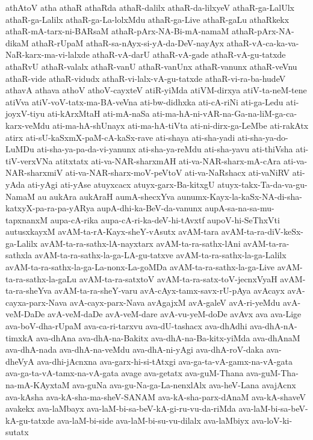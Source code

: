 {athAtoV
atha
athaR
athaRda
athaR-dalilx
athaR-da-lilxyeV
athaR-ga-LalUlx
athaR-ga-Lalilx
athaR-ga-La-lolxMdu
athaR-ga-Live
athaR-gaLu
athaRkekx
athaR-mA-tarx-ni-BARsaM
athaR-pArx-NA-Bi-mA-namaM
athaR-pArx-NA-dikaM
athaR-rUpaM
athaR-sa-nAyx-si-yA-da-DeV-nayAyx
athaR-vA-ca-ka-va-NaR-karx-ma-vi-lalxde
athaR-vA-darU
athaR-vA-gade
athaR-vA-gu-tatxde
athaRvU
athaR-valalx
athaR-vanU
athaR-vanUnx
athaR-vanunx
athaR-veVnu
athaR-vide
athaR-vidudx
athaR-vi-lalx-vA-gu-tatxde
athaR-vi-ra-ba-hudeV
athavA
athava
athoV
athoV-cayxteV
atiR-yiMda
atiVM-dirxya
atiV-ta-neM-tene
atiVva
atiV-voV-tatx-ma-BA-veVna
ati-bw-didhxka
ati-cA-riNi
ati-ga-Ledu
ati-joyxV-tiyu
ati-kArxMtaH
ati-mA-naSa
ati-ma-hA-ni-vAR-na-Ga-na-liM-ga-ca-karx-veMdu
ati-ma-hA-shUnayx
ati-ma-hA-tiVta
ati-ni-dirx-ga-LeMbe
ati-rakAtx
atirx
ati-sU-kaSxmX-paM-cA-kaSx-rave
ati-shaya
ati-sha-yadi
ati-sha-ya-do-LuMDu
ati-sha-ya-pa-da-vi-yanunx
ati-sha-ya-reMdu
ati-sha-yavu
ati-thiVsha
ati-tiV-verxVNa
atitxtatx
ati-va-NAR-sharxmAH
ati-va-NAR-sharx-mA-cAra
ati-va-NAR-sharxmiV
ati-va-NAR-sharx-moV-peVtoV
ati-va-NaRshacx
ati-vaNiRV
ati-yAda
ati-yAgi
ati-yAse
atuyxcacx
atuyx-garx-Ba-kitxgU
atuyx-takx-Ta-da-va-gu-NamaM
au
aukAra
aukAraH
aumA-shecxYva
aunumx-Kayx-la-kaSx-NA-di-sha-katxyX-pa-ra-pa-yARya
aupA-dhi-ka-BeV-da-vanunx
aupA-sa-na-sa-mu-tapxnanxM
aupa-cA-rika
aupa-cA-ri-ka-deV-hi-tAvxtf
aupoV-hi-SeThxVti
autusxkayxM
avAM-ta-rA-Kayx-sheY-vAsutx
avAM-tara
avAM-ta-ra-diV-keSx-ga-Lalilx
avAM-ta-ra-sathx-lA-nayxtarx
avAM-ta-ra-sathx-lAni
avAM-ta-ra-sathxla
avAM-ta-ra-sathx-la-ga-LA-gu-tatxve
avAM-ta-ra-sathx-la-ga-Lalilx
avAM-ta-ra-sathx-la-ga-La-nonx-La-goMDa
avAM-ta-ra-sathx-la-ga-Live
avAM-ta-ra-sathx-la-gaLu
avAM-ta-ra-satxtoV
avAM-ta-ra-satx-toV-jecnxVyaH
avAM-ta-ra-sheYva
avAM-ta-ra-sheY-varu
avA-cAyx-tamx-savx-rU-pAya
avAcayx
avA-cayxa-parx-Nava
avA-cayx-parx-Nava
avAgajxM
avA-galeV
avA-ri-yeMdu
avA-veM-DaDe
avA-veM-daDe
avA-veM-dare
avA-vu-yeM-doDe
avAvx
ava
ava-Lige
ava-boV-dha-rUpaM
ava-ca-ri-tarxvu
ava-dU-tashacx
ava-dhAdhi
ava-dhA-nA-timxkA
ava-dhAna
ava-dhA-na-Bakitx
ava-dhA-na-Ba-kitx-yiMda
ava-dhAnaM
ava-dhA-nada
ava-dhA-na-veMdu
ava-dhA-ni-yAgi
ava-dhA-roV-daka
ava-dheVyA
ava-dhi-jAcnxna
ava-garx-hi-si-tAtxgi
ava-ga-ta-vA-gamx-na-vA-gata
ava-ga-ta-vA-tamx-na-vA-gata
avage
ava-getatx
ava-guM-Thana
ava-guM-Tha-na-mA-KAyxtaM
ava-guNa
ava-gu-Na-ga-La-nenxlAlx
ava-heV-Lana
avajAcnx
ava-kAsha
ava-kA-sha-ma-sheV-SANAM
ava-kA-sha-parx-dAnaM
ava-kA-shaveV
avakekx
ava-laMbayx
ava-laM-bi-sa-beV-kA-gi-ru-vu-da-riMda
ava-laM-bi-sa-beV-kA-gu-tatxde
ava-laM-bi-side
ava-laM-bi-su-vu-dilalx
ava-laMbiyx
ava-loV-ki-sutatx
}
